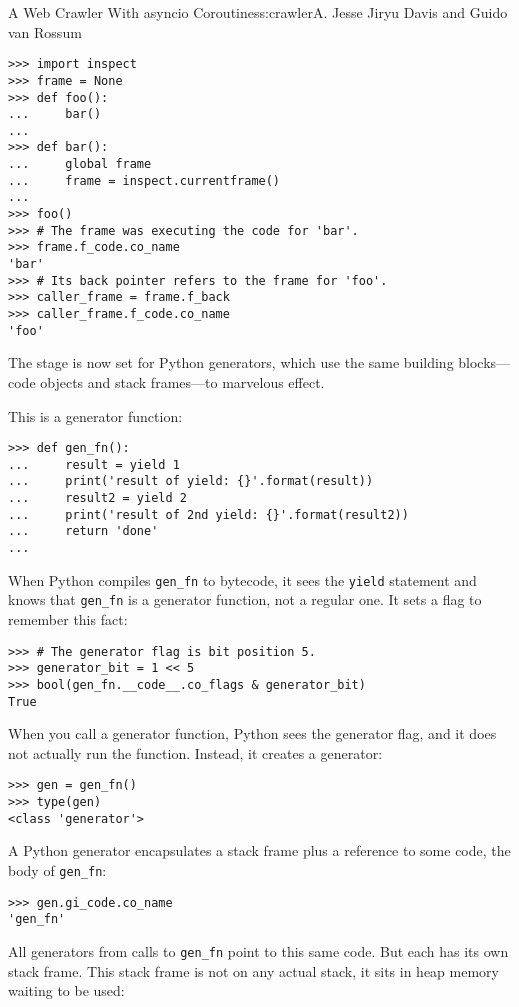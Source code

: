 \begin{aosachapter}{A Web Crawler With asyncio Coroutines}{s:crawler}{A. Jesse Jiryu Davis and Guido van Rossum}
\begin{verbatim}
>>> import inspect
>>> frame = None
>>> def foo():
...     bar()
...
>>> def bar():
...     global frame
...     frame = inspect.currentframe()
...
>>> foo()
>>> # The frame was executing the code for 'bar'.
>>> frame.f_code.co_name
'bar'
>>> # Its back pointer refers to the frame for 'foo'.
>>> caller_frame = frame.f_back
>>> caller_frame.f_code.co_name
'foo'
\end{verbatim}

The stage is now set for Python generators, which use the same building
blocks---code objects and stack frames---to marvelous effect.

This is a generator function:

\begin{verbatim}
>>> def gen_fn():
...     result = yield 1
...     print('result of yield: {}'.format(result))
...     result2 = yield 2
...     print('result of 2nd yield: {}'.format(result2))
...     return 'done'
...     
\end{verbatim}

When Python compiles \texttt{gen\_fn} to bytecode, it sees the
\texttt{yield} statement and knows that \texttt{gen\_fn} is a generator
function, not a regular one. It sets a flag to remember this fact:

\begin{verbatim}
>>> # The generator flag is bit position 5.
>>> generator_bit = 1 << 5
>>> bool(gen_fn.__code__.co_flags & generator_bit)
True
\end{verbatim}

When you call a generator function, Python sees the generator flag, and
it does not actually run the function. Instead, it creates a generator:

\begin{verbatim}
>>> gen = gen_fn()
>>> type(gen)
<class 'generator'>
\end{verbatim}

A Python generator encapsulates a stack frame plus a reference to some
code, the body of \texttt{gen\_fn}:

\begin{verbatim}
>>> gen.gi_code.co_name
'gen_fn'
\end{verbatim}

All generators from calls to \texttt{gen\_fn} point to this same code.
But each has its own stack frame. This stack frame is not on any actual
stack, it sits in heap memory waiting to be used:


\end{aosachapter}
